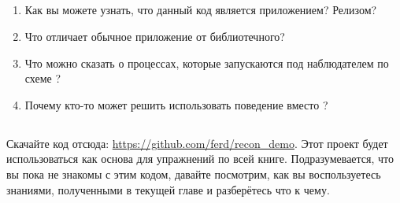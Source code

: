 \subsection*{\ReviewTitle{}}

\begin{enumerate}
	\item Как вы можете узнать, что данный код является приложением? Релизом?
	\item Что отличает обычное приложение от библиотечного?
	\item Что можно сказать о процессах, которые запускаются под наблюдателем по схеме ?
	\item Почему кто-то может решить использовать поведение  вместо ?
\end{enumerate}

\subsection*{\HandsOnTitle{}}

Скачайте код отсюда: \href{https://github.com/ferd/recon\_demo}{https://github.com/ferd/recon\_demo}. Этот проект будет использоваться как основа для упражнений по всей книге. Подразумевается, что вы пока не знакомы с этим кодом, давайте посмотрим, как вы воспользуетесь знаниями, полученными в текущей главе и разберётесь что к чему.

